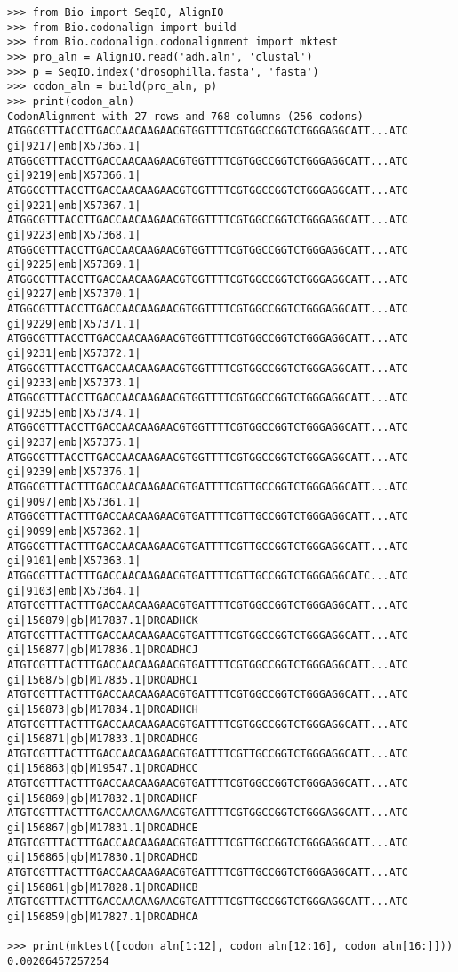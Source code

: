 \documentclass{article}
\begin{document}
\begin{verbatim}
>>> from Bio import SeqIO, AlignIO
>>> from Bio.codonalign import build
>>> from Bio.codonalign.codonalignment import mktest
>>> pro_aln = AlignIO.read('adh.aln', 'clustal')
>>> p = SeqIO.index('drosophilla.fasta', 'fasta')
>>> codon_aln = build(pro_aln, p)
>>> print(codon_aln)
CodonAlignment with 27 rows and 768 columns (256 codons)
ATGGCGTTTACCTTGACCAACAAGAACGTGGTTTTCGTGGCCGGTCTGGGAGGCATT...ATC gi|9217|emb|X57365.1|
ATGGCGTTTACCTTGACCAACAAGAACGTGGTTTTCGTGGCCGGTCTGGGAGGCATT...ATC gi|9219|emb|X57366.1|
ATGGCGTTTACCTTGACCAACAAGAACGTGGTTTTCGTGGCCGGTCTGGGAGGCATT...ATC gi|9221|emb|X57367.1|
ATGGCGTTTACCTTGACCAACAAGAACGTGGTTTTCGTGGCCGGTCTGGGAGGCATT...ATC gi|9223|emb|X57368.1|
ATGGCGTTTACCTTGACCAACAAGAACGTGGTTTTCGTGGCCGGTCTGGGAGGCATT...ATC gi|9225|emb|X57369.1|
ATGGCGTTTACCTTGACCAACAAGAACGTGGTTTTCGTGGCCGGTCTGGGAGGCATT...ATC gi|9227|emb|X57370.1|
ATGGCGTTTACCTTGACCAACAAGAACGTGGTTTTCGTGGCCGGTCTGGGAGGCATT...ATC gi|9229|emb|X57371.1|
ATGGCGTTTACCTTGACCAACAAGAACGTGGTTTTCGTGGCCGGTCTGGGAGGCATT...ATC gi|9231|emb|X57372.1|
ATGGCGTTTACCTTGACCAACAAGAACGTGGTTTTCGTGGCCGGTCTGGGAGGCATT...ATC gi|9233|emb|X57373.1|
ATGGCGTTTACCTTGACCAACAAGAACGTGGTTTTCGTGGCCGGTCTGGGAGGCATT...ATC gi|9235|emb|X57374.1|
ATGGCGTTTACCTTGACCAACAAGAACGTGGTTTTCGTGGCCGGTCTGGGAGGCATT...ATC gi|9237|emb|X57375.1|
ATGGCGTTTACCTTGACCAACAAGAACGTGGTTTTCGTGGCCGGTCTGGGAGGCATT...ATC gi|9239|emb|X57376.1|
ATGGCGTTTACTTTGACCAACAAGAACGTGATTTTCGTTGCCGGTCTGGGAGGCATT...ATC gi|9097|emb|X57361.1|
ATGGCGTTTACTTTGACCAACAAGAACGTGATTTTCGTTGCCGGTCTGGGAGGCATT...ATC gi|9099|emb|X57362.1|
ATGGCGTTTACTTTGACCAACAAGAACGTGATTTTCGTTGCCGGTCTGGGAGGCATT...ATC gi|9101|emb|X57363.1|
ATGGCGTTTACTTTGACCAACAAGAACGTGATTTTCGTTGCCGGTCTGGGAGGCATC...ATC gi|9103|emb|X57364.1|
ATGTCGTTTACTTTGACCAACAAGAACGTGATTTTCGTGGCCGGTCTGGGAGGCATT...ATC gi|156879|gb|M17837.1|DROADHCK
ATGTCGTTTACTTTGACCAACAAGAACGTGATTTTCGTGGCCGGTCTGGGAGGCATT...ATC gi|156877|gb|M17836.1|DROADHCJ
ATGTCGTTTACTTTGACCAACAAGAACGTGATTTTCGTGGCCGGTCTGGGAGGCATT...ATC gi|156875|gb|M17835.1|DROADHCI
ATGTCGTTTACTTTGACCAACAAGAACGTGATTTTCGTGGCCGGTCTGGGAGGCATT...ATC gi|156873|gb|M17834.1|DROADHCH
ATGTCGTTTACTTTGACCAACAAGAACGTGATTTTCGTGGCCGGTCTGGGAGGCATT...ATC gi|156871|gb|M17833.1|DROADHCG
ATGTCGTTTACTTTGACCAACAAGAACGTGATTTTCGTTGCCGGTCTGGGAGGCATT...ATC gi|156863|gb|M19547.1|DROADHCC
ATGTCGTTTACTTTGACCAACAAGAACGTGATTTTCGTGGCCGGTCTGGGAGGCATT...ATC gi|156869|gb|M17832.1|DROADHCF
ATGTCGTTTACTTTGACCAACAAGAACGTGATTTTCGTGGCCGGTCTGGGAGGCATT...ATC gi|156867|gb|M17831.1|DROADHCE
ATGTCGTTTACTTTGACCAACAAGAACGTGATTTTCGTTGCCGGTCTGGGAGGCATT...ATC gi|156865|gb|M17830.1|DROADHCD
ATGTCGTTTACTTTGACCAACAAGAACGTGATTTTCGTTGCCGGTCTGGGAGGCATT...ATC gi|156861|gb|M17828.1|DROADHCB
ATGTCGTTTACTTTGACCAACAAGAACGTGATTTTCGTTGCCGGTCTGGGAGGCATT...ATC gi|156859|gb|M17827.1|DROADHCA

>>> print(mktest([codon_aln[1:12], codon_aln[12:16], codon_aln[16:]]))
0.00206457257254
\end{verbatim}
\end{document}
